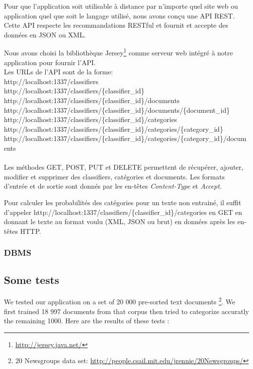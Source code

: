 \documentclass[a4paper,11pt]{article}
\begin{document}
Pour que l'application soit utilisable à distance par n'importe quel site web
ou application quel que soit le langage utilisé, nous avons conçu une API
REST. Cette API respecte les recommandations RESTful et fournit et accepte des
données en JSON ou XML.

Nous avons choisi la bibliothèque Jersey\footnote{\url{http://jersey.java.net/}}
comme serveur web intégré à notre application pour fournir l'API.
~\\

Les URLs de l'API sont de la forme:\\
http://localhost:1337/classifiers \\
http://localhost:1337/classifiers/\{classifier\_id\} \\
http://localhost:1337/classifiers/\{classifier\_id\}/documents \\
http://localhost:1337/classifiers/\{classifier\_id\}/documents/\{document\_id\} \\
http://localhost:1337/classifiers/\{classifier\_id\}/categories \\
http://localhost:1337/classifiers/\{classifier\_id\}/categories/\{category\_id\} \\
http://localhost:1337/classifiers/\{classifier\_id\}/categories/\{category\_id\}/documents \\
~\\

Les méthodes GET, POST, PUT et DELETE permettent de récupérer, ajouter,
modifier et supprimer des classifiers, catégories et documents. Les formats
d'entrée et de sortie sont donnés par les en-têtes \textit{Content-Type} et
\textit{Accept}.

Pour calculer les probabilités des catégories pour un texte non entrainé, il
suffit d'appeler http://localhost:1337/classifiers/\{classifier\_id\}/categories
en GET en donnant le texte au format voulu (XML, JSON ou brut) en données
après les en-têtes HTTP.


\subsubsection{DBMS}


\subsection{Some tests}
    
We tested our application on a set of 20 000 pre-sorted text documents
\footnote{20 Newsgroups data set: \url{http://people.csail.mit.edu/jrennie/20Newsgroups/}}.
We first trained 18 997 documents from that corpus then tried to categorize
accuratly the remaining 1000. Here are the results of these tests :
\end{document}

